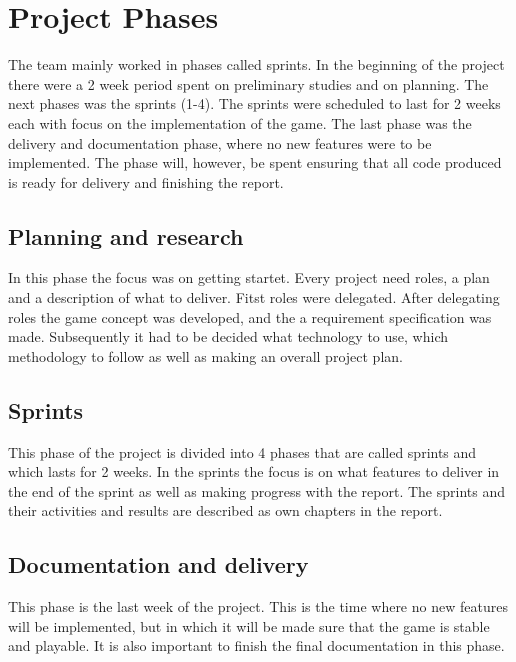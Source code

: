 \clearpage
\section{Project Phases}

The team mainly worked in phases called sprints. In the beginning of the project there were a 2 week period spent on preliminary studies and on planning. The next phases was the sprints (1-4). The sprints were scheduled to last for 2 weeks each with focus on the implementation of the game. The last phase was the delivery and documentation phase, where no new features were to be implemented. The phase will, however, be spent ensuring that all code produced is ready for delivery and finishing the report.

\subsection{Planning and research}
In this phase the focus was on getting startet. Every project need roles, a plan and a description of what to deliver. Fitst roles were delegated. After delegating roles the game concept was developed, and the a requirement specification was made. Subsequently it had to be decided what technology to use, which methodology to follow as well as making an overall project plan. 

\subsection{Sprints}
This phase of the project is divided into 4 phases that are called sprints and which lasts for 2 weeks. In the sprints the focus is on what features to deliver in the end of the sprint as well as making progress with the report. The sprints and their activities and results are described as own chapters in the report.

\subsection{Documentation and delivery}
This phase is the last week of the project. This is the time where no new features will be implemented, but in which it will be made sure that the game is stable and playable. It is also important to finish the final documentation in this phase.
